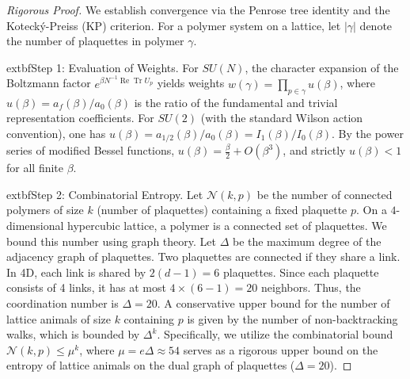 \begin{proof}[Rigorous Proof]
We establish convergence via the Penrose tree identity and the Koteck\'y-Preiss (KP) criterion. For a polymer system on a lattice, let $| \gamma |$ denote the number of plaquettes in polymer $\gamma$.

    	extbf{Step 1: Evaluation of Weights.} For $SU(N)$, the character expansion of the Boltzmann factor $e^{\beta N^{-1} \operatorname{Re} \operatorname{Tr} U_p}$ yields weights $w(\gamma) = \prod_{p \in \gamma} u(\beta)$, where $u(\beta) = a_{f}(\beta)/a_0(\beta)$ is the ratio of the fundamental and trivial representation coefficients. For $SU(2)$ (with the standard Wilson action convention), one has $u(\beta)=a_{1/2}(\beta)/a_{0}(\beta)=I_1(\beta)/I_0(\beta)$. By the power series of modified Bessel functions, $u(\beta)=\frac{\beta}{2}+O(\beta^3)$, and strictly $u(\beta) < 1$ for all finite $\beta$.


        extbf{Step 2: Combinatorial Entropy.} Let $\mathcal{N}(k, p)$ be the number of connected polymers of size $k$ (number of plaquettes) containing a fixed plaquette $p$. On a $4$-dimensional hypercubic lattice, a polymer is a connected set of plaquettes. 
    We bound this number using graph theory. Let $\Delta$ be the maximum degree of the adjacency graph of plaquettes. Two plaquettes are connected if they share a link. In 4D, each link is shared by $2(d-1)=6$ plaquettes. Since each plaquette consists of 4 links, it has at most $4 \times (6-1) = 20$ neighbors. Thus, the coordination number is $\Delta=20$.
    A conservative upper bound for the number of lattice animals of size $k$ containing $p$ is given by the number of non-backtracking walks, which is bounded by $\Delta^k$. Specifically, we utilize the combinatorial bound $\mathcal{N}(k, p) \le \mu^k$, where $\mu = e\Delta \approx 54$ serves as a rigorous upper bound on the entropy of lattice animals on the dual graph of plaquettes ($\Delta=20$).
		

\end{proof}
